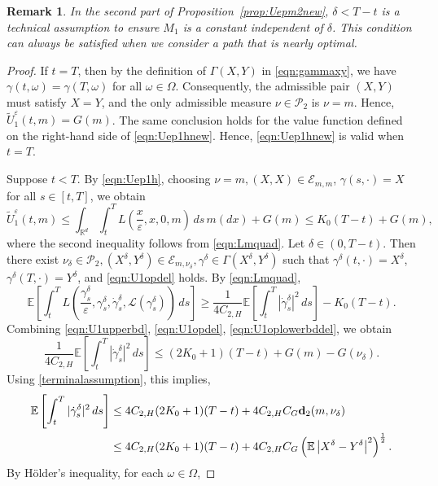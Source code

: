\documentclass[reqno,11pt]{amsart}
\newtheorem{remark}[theorem]{Remark}
\numberwithin{equation}{section}
\newcommand{\R}{\mathbb{R}} %
\newcommand{\e}{\varepsilon}
\newcommand{\ep}{\varepsilon}
\begin{document}
\begin{remark}
In the second part of Proposition~\ref{prop:Uepm2new}, $\delta<T-t$ is a technical assumption to ensure $M_1$ is a constant independent of $\delta$. This condition can always be satisfied when we consider a path that is nearly optimal.
\end{remark}

\begin{proof}
If $t=T$, then by the definition of $\Gamma(X,  Y)$ in \eqref{eqn:gammaxy}, we have $\gamma(t,\omega)=\gamma(T,\omega)$ for all $\omega\in \Omega$. Consequently, the admissible pair $(X, Y)$ must satisfy $X=Y$, and the only admissible measure $\nu \in \mathcal{P}_2$ is $\nu=m$. Hence, $\tilde{U}_1^\ep\left(t, m\right)=G(m)$. The same conclusion holds for the value function defined on the right-hand side of \eqref{eqn:Uep1hnew}. Hence, \eqref{eqn:Uep1hnew} is valid when $t=T$.


Suppose $t<T$. By \eqref{eqn:Uep1h}, choosing $\nu=m, (X, X) \in \mathcal{E}_{m, m}$, $ \gamma (s,\cdot) =X$ for all $s \in [t,T]
$, we obtain
\begin{equation}\label{eqn:U1upperbd}
   \tilde{U}_1^\ep\left(t, m\right) \leq \int_{\R^d}\int^T_{t}L\left(\frac{x}{\varepsilon},x, 0,m\right) \, ds\, m(dx)+G(m)\leq K_0(T-t)+ G(m),
\end{equation}
where the second inequality follows from \eqref{eqn:Lmquad}.
Let $\delta \in \left(0, T- t\right)$. Then there exist $\nu_\delta \in \mathcal{P}_2, (X^\delta,Y^\delta) \in \mathcal{E}_{m,\nu_\delta}, \gamma^\delta\in \Gamma(X^\delta,Y^\delta)$ such that $\gamma^\delta \left(t, \cdot\right)=X^\delta$, $\gamma^\delta \left(T, \cdot\right)=Y^\delta$, and
\eqref{eqn:U1opdel} holds. By \eqref{eqn:Lmquad},
\begin{equation} \label{eqn:U1oplowerbddel}
\mathbb{E}\left[
\int_{t}^T
L\left(
\frac{\gamma^\delta_s}{\e},
\gamma^\delta_s,
\dot{\gamma}^\delta_s,
\mathcal{L}(\gamma^\delta_s)
\right)\, ds
\right]  \geq \frac{1}{4C_{2, H}}\mathbb{E}\left[\int_{t}^T|\dot{\gamma}^\delta_s|^2 \,ds\right]- K_0(T-t).
\end{equation}
Combining \eqref{eqn:U1upperbd}, \eqref{eqn:U1opdel}, \eqref{eqn:U1oplowerbddel}, we obtain
\[
\frac{1}{4C_{2, H}}\mathbb{E}\left[\int_{t}^T|\dot{\gamma}^\delta_s|^2 \,ds\right] \leq (2K_0+1)(T-t)+ G(m)-G(\nu_\delta).
\]
Using \eqref{terminalassumption}, this implies,
\begin{equation}\label{eqn:velbdimp}
\begin{aligned}
\mathbb{E}\left[\int_{t}^T|\dot{\gamma}^\delta_s|^2 \,ds\right]
& \leq 4C_{2, H}(2K_0+1)(T-t)+ 4C_{2, H}C_G{\bf d}_2(m,\nu_{\delta})\\
& \leq 4C_{2, H}(2K_0+1)(T-t)+ 4C_{2, H}C_G \left(\mathbb{E}\left|X^\delta-Y^\delta\right|^2\right)^\frac{1}{2}.
\end{aligned}
\end{equation}
By H{\"o}lder’s inequality, for each $\omega \in \Omega$,


\end{proof}
\end{document}
